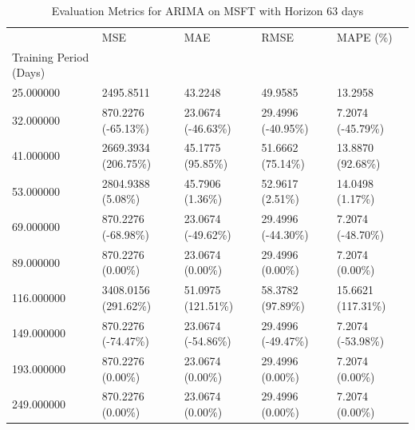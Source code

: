 \begin{table}
\caption{Evaluation Metrics for ARIMA on MSFT with Horizon 63 days}
\label{tab:arima_MSFT_h63_metrics}
\begin{tabular}{lllll}
\toprule
 & MSE & MAE & RMSE & MAPE (\%) \\
Training Period (Days) &  &  &  &  \\
\midrule
25.000000 & 2495.8511 & 43.2248 & 49.9585 & 13.2958 \\
32.000000 & 870.2276 (-65.13\%) & 23.0674 (-46.63\%) & 29.4996 (-40.95\%) & 7.2074 (-45.79\%) \\
41.000000 & 2669.3934 (206.75\%) & 45.1775 (95.85\%) & 51.6662 (75.14\%) & 13.8870 (92.68\%) \\
53.000000 & 2804.9388 (5.08\%) & 45.7906 (1.36\%) & 52.9617 (2.51\%) & 14.0498 (1.17\%) \\
69.000000 & 870.2276 (-68.98\%) & 23.0674 (-49.62\%) & 29.4996 (-44.30\%) & 7.2074 (-48.70\%) \\
89.000000 & 870.2276 (0.00\%) & 23.0674 (0.00\%) & 29.4996 (0.00\%) & 7.2074 (0.00\%) \\
116.000000 & 3408.0156 (291.62\%) & 51.0975 (121.51\%) & 58.3782 (97.89\%) & 15.6621 (117.31\%) \\
149.000000 & 870.2276 (-74.47\%) & 23.0674 (-54.86\%) & 29.4996 (-49.47\%) & 7.2074 (-53.98\%) \\
193.000000 & 870.2276 (0.00\%) & 23.0674 (0.00\%) & 29.4996 (0.00\%) & 7.2074 (0.00\%) \\
249.000000 & 870.2276 (0.00\%) & 23.0674 (0.00\%) & 29.4996 (0.00\%) & 7.2074 (0.00\%) \\
\bottomrule
\end{tabular}
\end{table}
